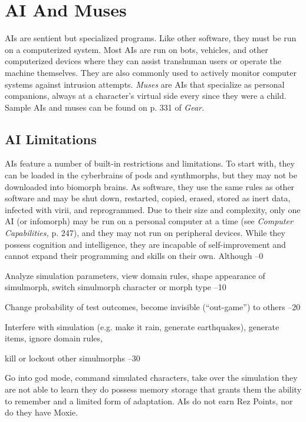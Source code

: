 \section{AI And Muses} 

AIs are sentient but specialized programs. Like other software, they must be run on a computerized system. Most AIs are run on bots, vehicles, and other computerized devices where they can assist transhuman users or operate the machine themselves. They are also commonly used to actively monitor computer systems against intrusion attempts. \textit{Muses} are AIs that specialize as personal companions, always at a character's virtual side every since they were a child. Sample AIs and muses can be found on p. 331 of \textit{Gear.} 

\subsection{AI Limitations} 

AIs feature a number of built-in restrictions and limitations. To start with, they can be loaded in the cyberbrains of pods and synthmorphs, but they may not be downloaded into biomorph brains. As software, they use the same rules as other software and may be shut down, restarted, copied, erased, stored as inert data, infected with virii, and reprogrammed. Due to their size and complexity, only one AI (or infomorph) may be run on a personal computer at a time (see \textit{Computer Capabilities,} p. 247), and they may not run on peripheral devices. While they possess cognition and intelligence, they are incapable of self-improvement and cannot expand their programming and skills on their own. Although –0 

Analyze simulation parameters, view domain rules, shape appearance of simulmorph, switch simulmorph character or morph type –10 

Change probability of test outcomes, become invisible (``out-game'') to others –20 

Interfere with simulation (e.g. make it rain, generate earthquakes), generate items, ignore domain rules, 

kill or lockout other simulmorphs –30 

Go into god mode, command simulated characters, take over the simulation they are not able to learn they do possess memory storage that grants them the ability to remember and a limited form of adaptation. AIs do not earn Rez Points, nor do they have Moxie. 

